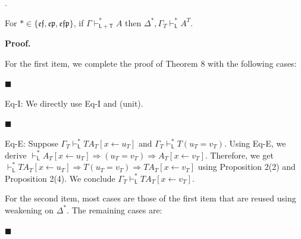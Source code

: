 \documentclass[10pt,a4paper]{article}
\begin{document}
 
 
\par{}. 
 
For $*\in\{\mathfrak{e}\mathfrak{f},\mathfrak{e}\mathfrak{p},\mathfrak{e}\mathfrak{f}\mathfrak{p}\}$, if $\Gamma\vdash_{\mathsf{L}+\mathsf{T}}^{*}A$ then $\Delta^{*},\Gamma_{T}\vdash_{\mathsf{L}}^{*}A^{T}$.\par
 
 
  
 
 
 
 
\par\medskip\noindent\textbf{Proof.}\par
 
 
For the first item, we complete the proof of Theorem 8 with the following cases:\par
  
\par\noindent  $\blacksquare$ 
 
Eq-I: We directly use Eq-I and (unit).\par
 
 
 
\par\noindent  $\blacksquare$ 
 
Eq-E: Suppose $\Gamma_{T}\vdash_{\mathsf{L}}^{*}TA_{T}[x\leftarrow u_{T}]$ and $\Gamma_{T}\vdash_{\mathsf{L}}^{*}T(u_{T}=v_{T})$. Using Eq-E, we derive $\vdash_{\mathsf{L}}^{*}A_{T}[x\leftarrow u_{T}]\mathbin{\Rightarrow}(u_{T}=v_{T})\mathbin{\Rightarrow}A_{T}[x\leftarrow v_{T}]$. Therefore, we get $\vdash_{\mathsf{L}}^{*}TA_{T}[x\leftarrow u_{T}]\mathbin{\Rightarrow}T(u_{T}=v_{T})\mathbin{\Rightarrow}TA_{T}[x\leftarrow v_{T}]$ using Proposition 2(2) and Proposition 2(4). We conclude $\Gamma_{T}\vdash_{\mathsf{L}}^{*}TA_{T}[x\leftarrow v_{T}]$.\par
 
 
  
For the second item, most cases are those of the first item that are reused using weakening on $\Delta^{*}$. The remaining cases are:\par
  
\par\noindent  $\blacksquare$ 
 
\end{document}
